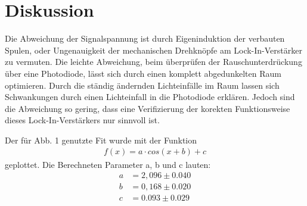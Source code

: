 \section{Diskussion}
\label{sec:Diskussion}
Die Abweichung der Signalspannung ist durch Eigeninduktion der verbauten Spulen, oder Ungenauigkeit der mechanischen Drehknöpfe am Lock-In-Verstärker zu vermuten.
Die leichte Abweichung, beim überprüfen der Rauschunterdrückung über eine Photodiode,
lässt sich durch einen komplett abgedunkelten Raum optimieren.
Durch die ständig ändernden Lichteinfälle im Raum lassen sich Schwankungen durch einen Lichteinfall in die Photodiode erklären.
Jedoch sind die Abweichung so gering, dass eine Verifizierung der korekten Funktionsweise dieses Lock-In-Verstärkers nur sinnvoll ist.

\newpage
Der für Abb. 1 genutzte Fit wurde mit der Funktion 
\begin{align}
    f(x) = a \cdot cos(x + b) +c
\end{align}
geplottet. Die Berechneten Parameter a, b und c lauten:
\begin{align}
    a &= 2,096 \pm 0.040 \\
    b &= 0,168 \pm 0.020 \\
    c &= 0.093 \pm 0.029
\end{align}
